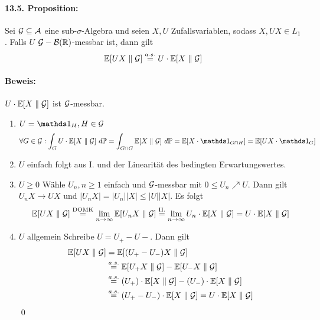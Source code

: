 \documentclass[11pt]{report}
\begin{document}
     \paragraph{13.5. Proposition:}Sei $\mathcal{G}\subseteq\mathcal{A}$ eine sub-$\sigma$-Algebra und seien $X,U$ Zufallsvariablen, sodass $X,UX\in L_1$. Falls $U$ $\mathcal{G}-\mathcal{B}(\mathbb{R})$-messbar ist, dann gilt
     $$\mathbb{E}[UX\parallel\mathcal{G}]\overset{a.s.}{=}U\cdot\mathbb{E}[X\parallel\mathcal{G}]$$
     
     \paragraph{Beweis:}$U\cdot\mathbb{E}[X\parallel\mathcal{G}]$ ist $\mathcal{G}$-messbar.
     \begin{enumerate}[label=\Roman*.]
         \item $U=\ind{H},H\in\G$\newline
         $$\forall G\in\G:\int_GU\cdot\E[X\parallel\G]\ d\Pp=\int_{G\cap G}\E[X\parallel\G]\ d\Pp=\E[X\cdot\ind{G\cap H}]=\E[UX\cdot\ind{G}]$$
         \item $U$ einfach\newline
         folgt aus I. und der Linearität des bedingten Erwartungswertes.
         \item $U\geq0$\newline
         Wähle $U_n,n\geq1$ einfach und $\mathcal{G}$-messbar mit $0\leq U_n\nearrow U$. Dann gilt $U_nX\to UX$ und $|U_nX|=|U_n||X|\leq|U||X|$. Es folgt
         \begin{align*}
             \mathbb{E}[UX\parallel\mathcal{G}]\overset{\text{DOMK}}{=}\lim_{n\to\infty}\mathbb{E}[U_n X\parallel{\mathcal{G}}]\overset{\text{II.}}{=}\lim_{n\to\infty}U_n\cdot\mathbb{E}[X\parallel\mathcal{G}]=U\cdot\mathbb{E}[X\parallel\mathcal{G}]
         \end{align*}
         \item $U$ allgemein\newline
         Schreibe $U=U_+-U-$. Dann gilt
         \begin{align*}
             \mathbb{E}[UX\parallel\mathcal{G}]&=\mathbb{E}[(U_+-U_-)X\parallel\mathcal{G}]\\
             &\overset{a.s.}{=}\mathbb{E}[U_+X\parallel\mathcal{G}]-\mathbb{E}[U_-X\parallel\mathcal{G}]\\
             &\overset{a.s.}{=}(U_+)\cdot\mathbb{E}[X\parallel\mathcal{G}]-(U_-)\cdot\mathbb{E}[X\parallel\mathcal{G}]\\
             &\overset{a.s.}{=}(U_+-U_-)\cdot\mathbb{E}[X\parallel\mathcal{G}]=U\cdot\mathbb{E}[X\parallel\mathcal{G}]
         \end{align*}
         \qed
     \end{enumerate}
     
\end{document}
